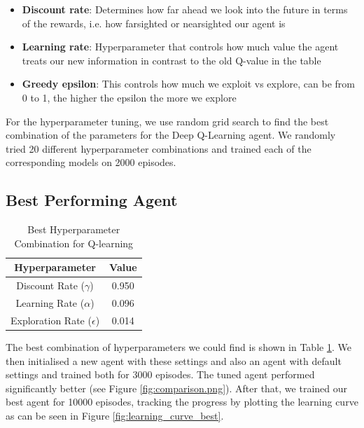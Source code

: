 \documentclass[a4paper,12pt]{article}
\begin{document}
\begin{itemize}
    \item \textbf{Discount rate}: Determines how far ahead we look into the future in terms of the rewards, i.e. how farsighted or nearsighted our agent is
    \item \textbf{Learning rate}: Hyperparameter that controls how much value the agent treats our new information in contrast to the old Q-value in the table 
    \item \textbf{Greedy epsilon}: This controls how much we exploit vs explore, can be from 0 to 1, the higher the epsilon the more we explore 
\end{itemize}
For the hyperparameter tuning, we use random grid search to find the best combination of the parameters for the Deep Q-Learning agent. We randomly tried 20 different
hyperparameter combinations and trained each of the corresponding models on 2000 episodes.

\subsection{Best Performing Agent}
\begin{table}[h]
    \centering
    \begin{tabular}{|c|c|}
        \hline
        Hyperparameter & Value \\
        \hline
        Discount Rate (\(\gamma\)) & 0.950 \\
        \hline
        Learning Rate (\(\alpha\)) & 0.096 \\
        \hline
        Exploration Rate (\(\epsilon\)) & 0.014 \\
        \hline
    \end{tabular}
    \caption{Best Hyperparameter Combination for Q-learning}
    \label{tab:best_hyperparams}
\end{table}

The best combination of hyperparameters we could find is shown in Table \ref{tab:best_hyperparams}. We then initialised a 
new agent with these settings and also an agent with default settings and trained both for 3000 episodes. The tuned agent 
performed significantly better (see Figure \ref{fig:comparison.png}). After that, we trained our best agent for 10000 episodes, 
tracking the progress by plotting the learning curve as can be seen in Figure \ref{fig:learning_curve_best}.
\end{document}
